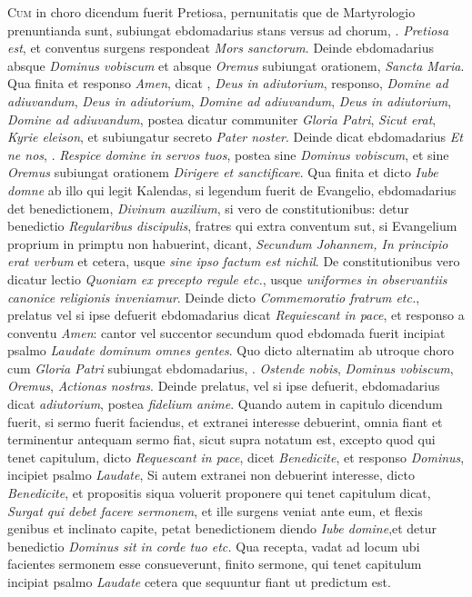 \begin{multicols*}{2}
{\color{Red} }
\lettrine[lines=2]{\zallmancaps \color{Red} C}{um} in choro dicendum fuerit Pretiosa, pernunitatis que de Martyrologio prenuntianda sunt, subiungat ebdomadarius stans versus ad chorum, \Vbar . \textit{Pretiosa est}, et conventus surgens respondeat \textit{Mors sanctorum}. Deinde ebdomadarius absque \textit{Dominus vobiscum} et absque \textit{Oremus} subiungat orationem, \textit{Sancta Maria}. Qua finita et responso \textit{Amen}, dicat \Vbar , \textit{Deus in adiutorium}, responso, \textit{Domine ad adiuvandum}, \textit{Deus in adiutorium}, \textit{Domine ad adiuvandum}, \textit{Deus in adiutorium}, \textit{Domine ad adiuvandum}, postea dicatur communiter \textit{Gloria Patri}, \textit{Sicut erat}, \textit{Kyrie eleison}, et subiungatur secreto \textit{Pater noster}.
Deinde dicat ebdomadarius \textit{Et ne nos}, \Vbar . \textit{Respice domine in servos tuos}, postea sine \textit{Dominus vobiscum}, et sine \textit{Oremus} subiungat orationem \textit{Dirigere et sanctificare}.
Qua finita et dicto \textit{Iube domne} ab illo qui legit Kalendas, si legendum fuerit de Evangelio, ebdomadarius det benedictionem, \textit{Divinum auxilium}, si vero de constitutionibus: detur benedictio \textit{Regularibus discipulis}, fratres qui extra conventum sut, si Evangelium proprium in primptu non habuerint, dicant, \textit{Secundum Johannem, In principio erat verbum} et cetera, usque \textit{sine ipso factum est nichil}. De constitutionibus vero dicatur lectio \textit{Quoniam ex precepto regule etc.}, usque \textit{uniformes in observantiis canonice religionis inveniamur}. Deinde dicto \textit{Commemoratio fratrum etc.}, prelatus vel si ipse defuerit ebdomadarius dicat \textit{Requiescant in pace}, et responso a conventu \textit{Amen}: cantor vel succentor secundum quod ebdomada fuerit incipiat psalmo \textit{Laudate dominum omnes gentes}. Quo dicto alternatim ab utroque choro cum \textit{Gloria Patri} subiungat ebdomadarius, \Vbar . \textit{Ostende nobis}, \textit{Dominus vobiscum}, \textit{Oremus}, \textit{Actionas nostras}. Deinde prelatus, vel si ipse defuerit, ebdomadarius dicat \textit{adiutorium}, postea \textit{fidelium anime}.
Quando autem in capitulo dicendum fuerit, si sermo fuerit faciendus, et extranei interesse debuerint, omnia fiant et terminentur antequam sermo fiat, sicut supra notatum est, excepto quod qui tenet capitulum, dicto \textit{Requescant in pace}, dicet \textit{Benedicite}, et responso \textit{Dominus}, incipiet psalmo \textit{Laudate}, Si autem extranei non debuerint interesse, dicto \textit{Benedicite}, et propositis siqua voluerit proponere qui tenet capitulum dicat, \textit{Surgat qui debet facere sermonem}, et ille surgens veniat ante eum, et flexis genibus et inclinato capite, petat benedictionem diendo \textit{Iube domine},et detur benedictio \textit{Dominus sit in corde tuo etc.} Qua recepta, vadat ad locum ubi facientes sermonem esse consueverunt, finito sermone, qui tenet capitulum incipiat psalmo \textit{Laudate} cetera que sequuntur fiant ut predictum est.

\end{multicols*}
